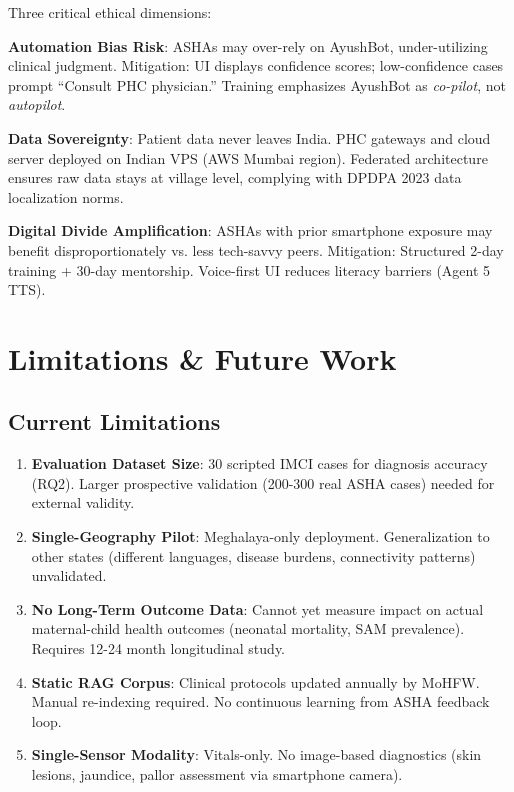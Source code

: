\documentclass[conference,compsoc]{IEEEtran}
\begin{document}
Three critical ethical dimensions:

\textbf{Automation Bias Risk}: ASHAs may over-rely on AyushBot, under-utilizing clinical judgment. Mitigation: UI displays confidence scores; low-confidence cases prompt ``Consult PHC physician.'' Training emphasizes AyushBot as \textit{co-pilot}, not \textit{autopilot}.

\textbf{Data Sovereignty}: Patient data never leaves India. PHC gateways and cloud server deployed on Indian VPS (AWS Mumbai region). Federated architecture ensures raw data stays at village level, complying with DPDPA 2023 data localization norms.

\textbf{Digital Divide Amplification}: ASHAs with prior smartphone exposure may benefit disproportionately vs. less tech-savvy peers. Mitigation: Structured 2-day training + 30-day mentorship. Voice-first UI reduces literacy barriers (Agent 5 TTS).

\section{Limitations \& Future Work}

\subsection{Current Limitations}

\begin{enumerate}
    \item \textbf{Evaluation Dataset Size}: 30 scripted IMCI cases for diagnosis accuracy (RQ2). Larger prospective validation (200-300 real ASHA cases) needed for external validity.
    \item \textbf{Single-Geography Pilot}: Meghalaya-only deployment. Generalization to other states (different languages, disease burdens, connectivity patterns) unvalidated.
    \item \textbf{No Long-Term Outcome Data}: Cannot yet measure impact on actual maternal-child health outcomes (neonatal mortality, SAM prevalence). Requires 12-24 month longitudinal study.
    \item \textbf{Static RAG Corpus}: Clinical protocols updated annually by MoHFW. Manual re-indexing required. No continuous learning from ASHA feedback loop.
    \item \textbf{Single-Sensor Modality}: Vitals-only. No image-based diagnostics (skin lesions, jaundice, pallor assessment via smartphone camera).
\end{enumerate}
\end{document}

